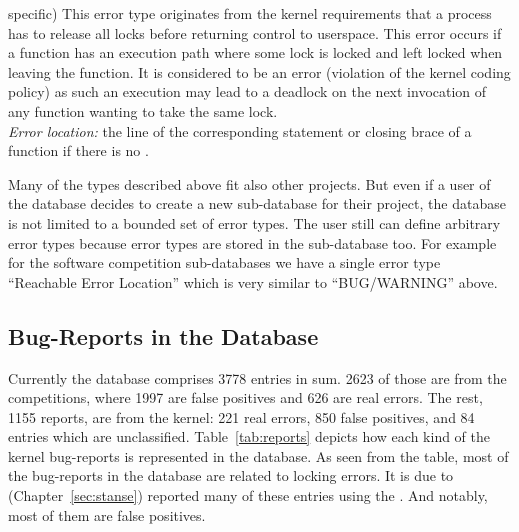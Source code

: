 \begin{description}
  specific) This error type originates from the kernel requirements that a
  process has to release all locks before returning control to userspace.
  This error occurs if a function has an execution path where some lock is
  locked and left locked when leaving the function. It is considered to be
  an error (violation of the kernel coding policy) as such an execution may
  lead to a deadlock on the next invocation of any function wanting to take
  the same lock. \\
  \emph{Error location:} the line of the corresponding 
  statement or closing brace of a function if there is no .
\end{description}

Many of the types described above fit also other projects. But even if a user
of the database decides to create a new sub-database for their project, the
database is not limited to a bounded set of error types. The user still can
define arbitrary error types because error types are stored in the
sub-database too. For example for the software competition sub-databases we
have a single error type ``Reachable Error Location'' which is very similar to
``BUG/WARNING'' above.

\subsection{Bug-Reports in the Database}

Currently the database comprises 3778 entries in sum. 2623 of those are from
the competitions, where 1997 are false positives and 626 are real errors. The
rest, 1155 reports, are from the kernel: 221 real errors, 850 false positives,
and 84 entries which are unclassified.  Table~\ref{tab:reports} depicts how
each kind of the kernel bug-reports is represented in the database. As seen
from the table, most of the bug-reports in the database are related to locking
errors. It is due to \stan (Chapter~\ref{sec:stanse}) reported many of these
entries using the \AC. And notably, most of them are false positives.

